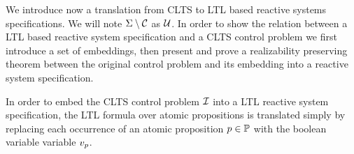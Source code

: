 
We introduce now a translation from CLTS to LTL based reactive systems specifications. We will note $\Sigma \setminus {\mathcal{C}}$ as ${\mathcal{U}}$. In order to show the relation between a LTL based reactive system specification and a CLTS control problem we first introduce a set of embeddings, then present and prove a realizability preserving theorem between the original control problem and its embedding into a reactive system specification.


In order to embed the CLTS control problem ${\mathcal{I}}$ into a LTL reactive system specification, the LTL formula over atomic propositions is translated simply by replacing each occurrence of an atomic proposition ${p} \in {\mathbb{P}}$ with the boolean variable variable $v_{{p}}$.
%	

